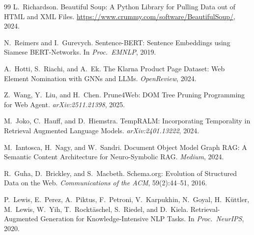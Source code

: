\documentclass[11pt]{article}
\begin{document}
\begin{thebibliography}{99}
L.~Richardson.
Beautiful Soup: A Python Library for Pulling Data out of HTML and XML Files.
\url{https://www.crummy.com/software/BeautifulSoup/}, 2024.

N.~Reimers and I.~Gurevych.
Sentence-BERT: Sentence Embeddings using Siamese BERT-Networks.
In \emph{Proc.\ EMNLP}, 2019.

A.~Hotti, S.~Riachi, and A.~Ek.
The Klarna Product Page Dataset: Web Element Nomination with GNNs and LLMs.
\emph{OpenReview}, 2024.

Z.~Wang, Y.~Liu, and H.~Chen.
Prune4Web: DOM Tree Pruning Programming for Web Agent.
\emph{arXiv:2511.21398}, 2025.

M.~Joko, C.~Hauff, and D.~Hiemstra.
TempRALM: Incorporating Temporality in Retrieval Augmented Language Models.
\emph{arXiv:2401.13222}, 2024.

M.~Iantosca, H.~Nagy, and W.~Sandri.
Document Object Model Graph RAG: A Semantic Content Architecture for Neuro-Symbolic RAG.
\emph{Medium}, 2024.

R.~Guha, D.~Brickley, and S.~Macbeth.
Schema.org: Evolution of Structured Data on the Web.
\emph{Communications of the ACM}, 59(2):44--51, 2016.

P.~Lewis, E.~Perez, A.~Piktus, F.~Petroni, V.~Karpukhin, N.~Goyal, H.~K\"{u}ttler, M.~Lewis, W.~Yih, T.~Rockt\"{a}schel, S.~Riedel, and D.~Kiela.
Retrieval-Augmented Generation for Knowledge-Intensive NLP Tasks.
In \emph{Proc.\ NeurIPS}, 2020.

\end{thebibliography}
\end{document}
